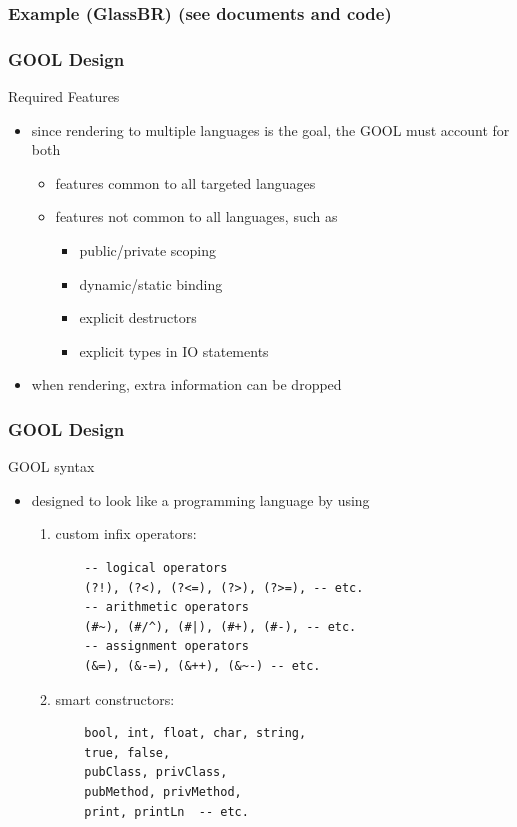 \documentclass{beamer}
\begin{document}
\begin{frame}
  \frametitle{Example (GlassBR)
(see documents and code)}
\end{frame}

\begin{frame}
\frametitle{GOOL Design}
{\Large Required Features}
\begin{itemize}
\item since rendering to multiple languages is the goal, the GOOL must account for both
\begin{itemize}
\item<2-> features common to all targeted languages
\item<3-> features not common to all languages, such as
\begin{itemize}
\item public/private scoping
\item dynamic/static binding
\item explicit destructors
\item explicit types in IO statements
\end{itemize}
\end{itemize}
\item<4-> when rendering, extra information can be dropped
\end{itemize}
\end{frame}

\begin{frame}
\frametitle{GOOL Design}
{\Large GOOL syntax}
\begin{itemize}
\item designed to look like a programming language by using
\begin{enumerate}
\item<2-> custom infix operators:
\begin{lstlisting}
    -- logical operators
    (?!), (?<), (?<=), (?>), (?>=), -- etc.
    -- arithmetic operators
    (#~), (#/^), (#|), (#+), (#-), -- etc.
    -- assignment operators
    (&=), (&-=), (&++), (&~-) -- etc.
\end{lstlisting}
\item<3-> smart constructors:
\begin{lstlisting}
    bool, int, float, char, string,
    true, false,
    pubClass, privClass, 
    pubMethod, privMethod,
    print, printLn  -- etc.
\end{lstlisting}
\end{enumerate}
\end{itemize}
\end{frame}
\end{document}
